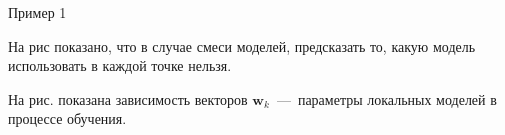 \documentclass[9pt,pdf,hyperref={unicode}]{beamer}
\begin{document}
\begin{frame}{Пример 1}
\justifying
\begin{figure}
\end{figure}
На рис показано, что в случае смеси моделей, предсказать то, какую модель использовать в каждой точке нельзя.

На рис. показана зависимость векторов $\mathbf{w}_{k}$~---~параметры локальных моделей в процессе обучения.

\end{frame}
\end{document}
